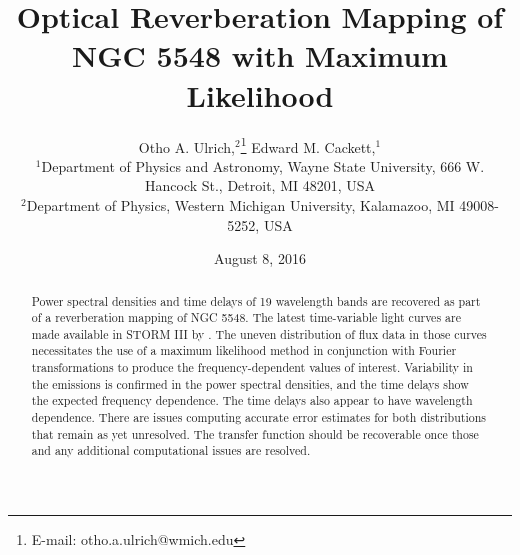 \documentclass[a4paper,fleqn,usenatbib]{article}
\begin{document}





\title[Optical Reverberation with Max Likelihood; NGC 5548]{Optical
Reverberation Mapping of NGC 5548 with Maximum Likelihood}

\author[Ulrich et al.]{
Otho A. Ulrich,$^{2}$\thanks{E-mail: otho.a.ulrich@wmich.edu}
Edward M. Cackett,$^{1}$
\\
$^{1}$Department of Physics and Astronomy, Wayne State University, 666 W.
Hancock St., Detroit, MI 48201, USA\\
$^{2}$Department of Physics, Western Michigan University, Kalamazoo, MI
49008-5252, USA\\
}

\date{August 8, 2016}


\label{firstpage}
\maketitle

\begin{abstract}
Power spectral densities and time delays of 19 wavelength bands are recovered
as part of a reverberation mapping of NGC 5548. The latest time-variable light
curves are made available in STORM III by \cite{2016ApJ...821...56F}. The
uneven distribution of flux data in those curves necessitates the use of a
maximum likelihood method in conjunction with Fourier transformations to
produce the frequency-dependent values of interest. Variability in the
emissions is confirmed in the power spectral densities, and the time delays
show the expected frequency dependence. The time delays also appear to have
wavelength dependence. There are issues computing accurate error estimates for
both distributions that remain as yet unresolved. The transfer function should
be recoverable once those and any additional computational issues are
resolved.
\end{abstract}
\end{document}
